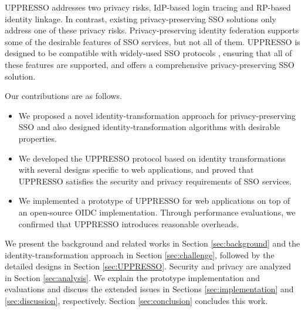 
UPPRESSO addresses two privacy risks, IdP-based login tracing and RP-based identity linkage. In contrast, existing privacy-preserving SSO solutions \cite{BrowserID, SPRESSO, NIST2017draft, FirefoxAccount} only address one of these privacy risks. Privacy-preserving identity federation \cite{PseudoID, ELPASSO, UnlimitID,Opaak,uprov,hyperledge-idemix} supports some of the desirable features of SSO services, but not all of them. UPPRESSO is designed to be compatible with widely-used SSO protocols \cite{OpenIDConnect, rfc6749, SAML, NIST2017draft}, ensuring that all of these features are supported, and offers a comprehensive privacy-preserving SSO solution.

Our contributions are as follows.
\vspace{-\topsep}\begin{itemize}
\setlength{\topsep}{0pt}
\setlength{\partopsep}{0pt}
\setlength{\itemsep}{0pt}
\setlength{\parsep}{0pt}
\setlength{\parskip}{0pt}
\item We proposed a novel identity-transformation approach for privacy-preserving SSO and also designed identity-transformation algorithms with desirable properties.
\item We developed the UPPRESSO protocol based on identity transformations    with several designs specific to web applications, and proved that UPPRESSO satisfies the security and privacy requirements of SSO services.
\item We implemented a prototype of UPPRESSO for web applications on top of an open-source OIDC implementation. Through performance evaluations, we confirmed that UPPRESSO introduces reasonable overheads.
\end{itemize}


We present the background and related works in Section \ref{sec:background} and the identity-transformation approach in Section \ref{sec:challenge}, followed by the detailed designs in Section \ref{sec:UPPRESSO}.
Security and privacy are analyzed in Section \ref{sec:analysis}.
 We explain the prototype implementation and evaluations
  and discuss the extended issues 
    in Sections \ref{sec:implementation} and \ref{sec:discussion}, respectively.
Section \ref{sec:conclusion} concludes this work.
